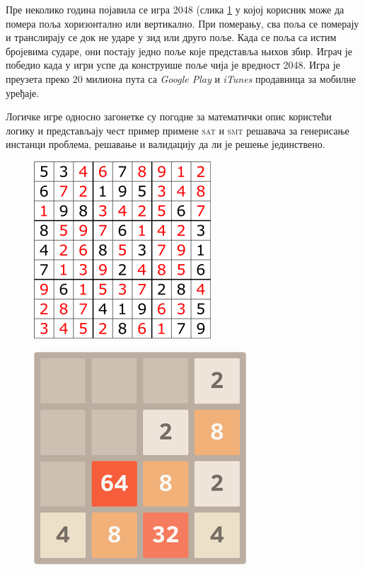 \documentclass[a4paper]{article}
\begin{document}
Пре неколико година појавила се игра 2048 (слика \ref{fig:2048} у којој корисник може да помера поља хоризонтално или вертикално.
При померању, сва поља се померају и транслирају се док не ударе у зид или друго поље. Када се поља са истим бројевима
сударе, они постају једно поље које представља њихов збир. Играч је победио када
у игри успе да конструише поље чија је вредност 2048. Игра је преузета преко 20 милиона пута са \emph{Google Play} и \emph{iTunes}
продавница за мобилне уређаје.

Логичке игре односно загонетке су погодне за математички опис користећи логику и представљају чест пример примене
\textsc{sat} и \textsc{smt} решавача за генерисање инстанци проблема, решавање и валидацију да ли је решење јединствено.

\begin{figure}
\centering
\begin{minipage}{.5\textwidth}
    \centering
    \includegraphics[width=.4\linewidth]{./slike/sudoku.png}
    \label{fig:sudoku}
\end{minipage}%
\begin{minipage}{.5\textwidth}
  \centering
  \includegraphics[width=.4\linewidth]{./slike/2048.png}
  \label{fig:2048}
\end{minipage}
\end{figure}


\end{document}
